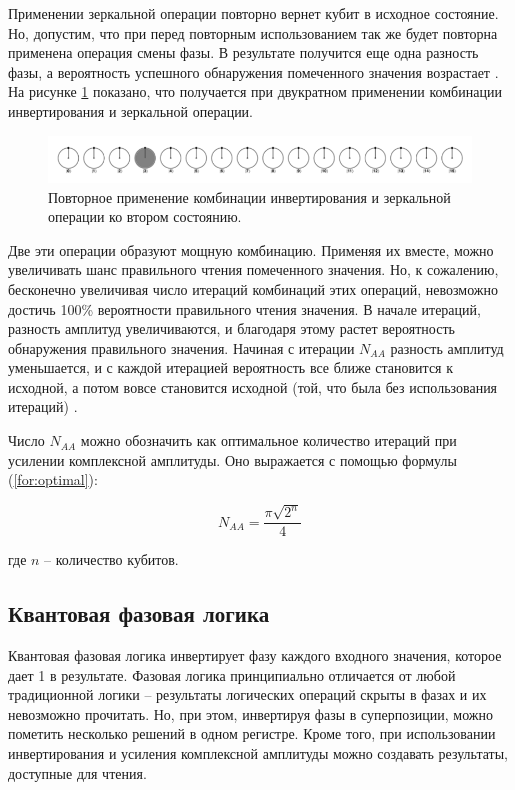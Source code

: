 Применении зеркальной операции повторно вернет кубит в исходное состояние. Но, допустим, что при перед повторным использованием так же будет повторна применена операция смены фазы. В результате получится еще одна разность фазы, а вероятность успешного обнаружения помеченного значения возрастает \cite{global-phase}. На рисунке \ref{img:ampl-03} показано, что получается при двукратном применении комбинации инвертирования и зеркальной операции.

\begin{figure}[H]
	\begin{center}
		\includegraphics[scale=0.58]{img/amplitude-example-03.png}
	\end{center}
	\captionsetup{justification=centering}
	\caption{Повторное применение комбинации инвертирования и зеркальной операции ко втором состоянию.}
	\label{img:ampl-03}
\end{figure}

Две эти операции образуют мощную комбинацию. Применяя их вместе, можно увеличивать шанс правильного чтения помеченного значения. Но, к сожалению, бесконечно увеличивая число итераций комбинаций этих операций, невозможно достичь 100\% вероятности правильного чтения значения. В начале итераций, разность амплитуд увеличиваются, и благодаря этому растет вероятность обнаружения правильного значения. Начиная с итерации $N_{AA}$ разность амплитуд уменьшается, и с каждой итерацией вероятность все ближе становится к исходной, а потом вовсе становится исходной (той, что была без использования итераций) \cite{PQC-amplitude}. 

Число $N_{AA}$ можно обозначить как оптимальное количество итераций при усилении комплексной амплитуды. Оно выражается с помощью формулы (\ref{for:optimal}):

\begin{equation}
	\label{for:optimal}
	N_{AA} = \frac{\pi\sqrt{2^{n}}}{4}
\end{equation}

где $n$ -- количество кубитов.


\subsection{Квантовая фазовая логика}

Квантовая фазовая логика инвертирует фазу каждого входного значения, которое дает 1 в результате.
Фазовая логика принципиально отличается от любой традиционной логики -- результаты логических операций скрыты в фазах и их невозможно прочитать. Но, при этом, инвертируя фазы в суперпозиции, можно пометить несколько решений в одном регистре. Кроме того, при использовании инвертирования и усиления комплексной амплитуды можно создавать результаты, доступные для чтения.

